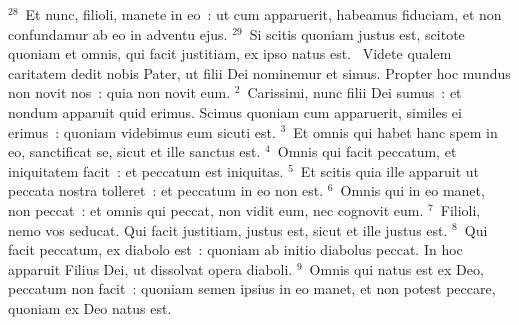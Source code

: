 ${}^{28}$~Et nunc, filioli, manete in eo~: ut cum apparuerit, habeamus fiduciam, et non confundamur ab eo in adventu ejus.
${}^{29}$~Si scitis quoniam justus est, scitote quoniam et omnis, qui facit justitiam, ex ipso natus est.
~Videte qualem caritatem dedit nobis Pater, ut filii Dei nominemur et simus. Propter hoc mundus non novit nos~: quia non novit eum.
${}^{2}$~Carissimi, nunc filii Dei sumus~: et nondum apparuit quid erimus. Scimus quoniam cum apparuerit, similes ei erimus~: quoniam videbimus eum sicuti est.
${}^{3}$~Et omnis qui habet hanc spem in eo, sanctificat se, sicut et ille sanctus est.
${}^{4}$~Omnis qui facit peccatum, et iniquitatem facit~: et peccatum est iniquitas.
${}^{5}$~Et scitis quia ille apparuit ut peccata nostra tolleret~: et peccatum in eo non est.
${}^{6}$~Omnis qui in eo manet, non peccat~: et omnis qui peccat, non vidit eum, nec cognovit eum.
${}^{7}$~Filioli, nemo vos seducat. Qui facit justitiam, justus est, sicut et ille justus est.
${}^{8}$~Qui facit peccatum, ex diabolo est~: quoniam ab initio diabolus peccat. In hoc apparuit Filius Dei, ut dissolvat opera diaboli.
${}^{9}$~Omnis qui natus est ex Deo, peccatum non facit~: quoniam semen ipsius in eo manet, et non potest peccare, quoniam ex Deo natus est.


